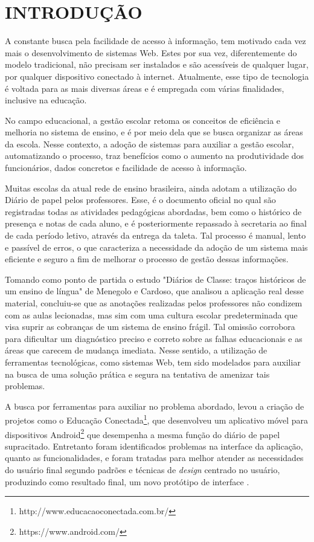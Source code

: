 \chapter{INTRODUÇÃO}
\label{cap:introducao}


A constante busca pela facilidade de acesso à informação, tem motivado cada vez mais o desenvolvimento de sistemas Web. Estes por sua vez, diferentemente do modelo tradicional, não precisam ser instalados e são acessíveis de qualquer lugar, por qualquer dispositivo conectado à internet. Atualmente, esse tipo de tecnologia é voltada para as mais diversas áreas e é empregada com várias finalidades, inclusive na educação.

No campo educacional, a gestão escolar retoma os conceitos de eficiência e melhoria no sistema de ensino, e é por meio dela que se busca organizar as áreas da escola. Nesse contexto, a adoção de sistemas para auxiliar a gestão escolar, automatizando o processo, traz benefícios como o aumento na produtividade dos funcionários, dados concretos e facilidade de acesso à informação. 


Muitas escolas da atual rede de ensino brasileira, ainda adotam a utilização do Diário de papel pelos professores. Esse, é o documento oficial no qual são registradas todas as atividades pedagógicas abordadas, bem como o histórico de presença e notas de cada aluno, e é posteriormente repassado à secretaria ao final de cada período letivo, através da entrega da taleta. Tal processo é manual, lento e passível de erros, o que caracteriza a necessidade da adoção de um sistema mais eficiente e seguro a fim de melhorar o processo de gestão dessas informações.



Tomando como ponto de partida o estudo "Diários de Classe: traços históricos de um ensino de língua" de Menegolo e Cardoso, que analisou a aplicação real desse material, concluiu-se que as anotações realizadas pelos professores não condizem com as aulas lecionadas, mas sim com uma cultura escolar predeterminada que visa suprir as cobranças de um sistema de ensino frágil. Tal omissão corrobora para dificultar um diagnóstico preciso e correto sobre as falhas educacionais e as áreas que carecem de mudança imediata. Nesse sentido, a utilização de ferramentas tecnológicas, como sistemas Web, tem sido modelados para auxiliar na busca de uma solução prática e segura na tentativa de amenizar tais problemas.



A busca por ferramentas para auxiliar no problema abordado, levou a criação de projetos como o Educação Conectada\footnote{http://www.educacaoconectada.com.br/}, que desenvolveu um aplicativo móvel para dispositivos Android\footnote{https://www.android.com/} que desempenha a mesma função do diário de papel supracitado. Entretanto foram identificados problemas na interface da aplicação, quanto as funcionalidades, e foram tratadas para melhor atender as necessidades do usuário final segundo padrões e técnicas de \textit{design} centrado no usuário, produzindo como resultado final, um novo protótipo de interface \cite{igor2016}. 


